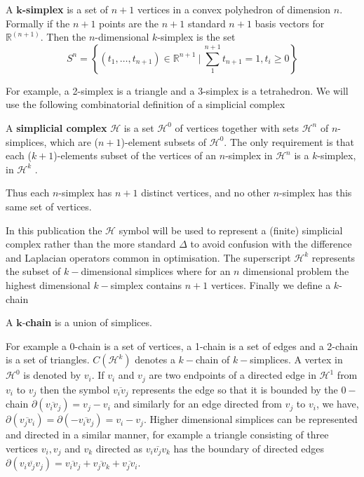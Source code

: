 \begin{definition}
A \textbf{$\mathbf{k}$-simplex} is a set of $n+1$ vertices in a convex polyhedron of dimension $n$. Formally if the $n+1$ points are the $n+1$ standard $n+1$ basis vectors for  $\mathbb{R}^{(n+1)}$. Then the $n$-dimensional $k$-simplex is the set
 $$ 
S^{n}=  \left\{ (t_1 ,\dots , t_{n +1})  \in\mathbb{R}^{n+1} ~|~ \sum^{n +1}_1 t_{n +1}  = 1,  t_i \geq  0  \right\}
$$

\end{definition}
For example, a 2-simplex is a triangle and a 3-simplex is a tetrahedron. We will use the following combinatorial definition of a simplicial complex \citep[p. 107]{Hatcher2011}
\begin{definition}
A \textbf{simplicial complex}  $\mathcal{H}$  is a set $\mathcal{H}^0$  of vertices together with sets $\mathcal{H}^n$  of $n$-simplices, which are ($n + 1$)-element subsets of $\mathcal{H}^0$. The only requirement is that each ($k + 1$)-elements subset of the vertices of an $n$-simplex in $\mathcal{H}^n$ is a $k$-simplex, in $\mathcal{H}^k$ .
\end{definition}
Thus each  $n$-simplex  has $n + 1$ distinct vertices, and no other $n$-simplex has this same set of vertices.

In this publication the $\mathcal{H}$ symbol will be used to represent a (finite) simplicial complex rather than the more standard $\Delta $ to avoid confusion with the difference and Laplacian operators common in optimisation. The superscript $\mathcal{H}^k$ represents the subset of $k-$dimensional simplices where for an $n$ dimensional problem the highest dimensional $k-$simplex contains $n + 1$ vertices. Finally we define a $k$-chain \citep{Henle1979}

\begin{definition}
A $\mathbf{k}$-\textbf{chain} is a union of simplices.
\end{definition}
For example a 0-chain is a set of vertices, a 1-chain is a set of edges and a 2-chain is a set of triangles. $C(\mathcal{H}^k)$ denotes a $k-$chain of $k-$simplices. A vertex in $\mathcal{H}^0$ is denoted by $v_i$. If $v_i$ and $v_j$ are two endpoints of a directed edge in $\mathcal{H}^1$ from $v_i$ to $v_j$ then the symbol $\overline{v_i v_j}$ represents the edge so that it is bounded by the $0-$chain $\partial \left( \overline{v_i v_j} \right) = v_j - v_i$ and similarly for an edge directed from $v_j$ to $v_i$, we have, $\partial \left( \overline{v_j v_i} \right) = \partial \left( - \overline{v_i v_j} \right) = v_i - v_j$. Higher dimensional simplices can be represented and directed in a similar manner, for example a triangle consisting of three vertices $v_i, v_j$ and $v_k$ directed as $\overline{v_i v_j v_k}$  has the boundary of directed edges $\partial \left( \overline{v_i v_j v_j} \right)  = \overline{v_i v_j} + \overline{v_j v_k} + \overline{v_j v_i}$.

